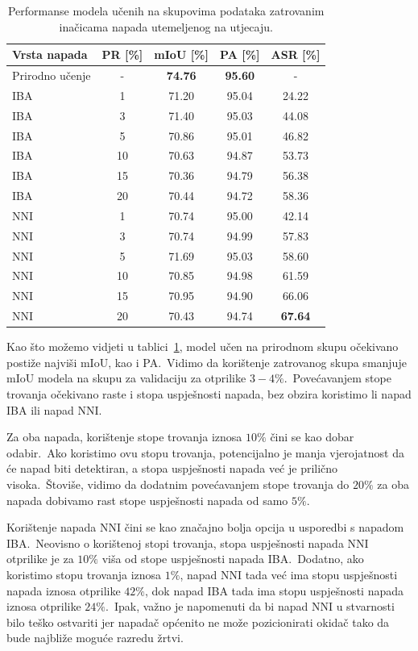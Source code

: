 \documentclass[times, utf8, seminar, numeric]{fer}
\begin{document}
\begin{table}[htb]
    \caption{Performanse modela učenih na skupovima podataka zatrovanim inačicama napada utemeljenog na utjecaju.}
    \label{tbl:performanse_iba}
    \centering
    \begin{tabular}{lcccc} \hline
    Vrsta napada & PR [\%] & mIoU [\%] & PA [\%] & ASR [\%] \\ \hline
    Prirodno učenje & - & \textbf{74.76} & \textbf{95.60} & - \\ \hline
    IBA & 1 & 71.20 & 95.04 & 24.22 \\
    IBA & 3 & 71.40 & 95.03 & 44.08 \\
    IBA & 5 & 70.86 & 95.01 & 46.82 \\
    IBA & 10 & 70.63 & 94.87 & 53.73 \\
    IBA & 15 & 70.36 & 94.79 & 56.38 \\
    IBA & 20 & 70.44 & 94.72 & 58.36 \\ \hline
    NNI & 1 & 70.74 & 95.00 & 42.14 \\
    NNI & 3 & 70.74 & 94.99 & 57.83 \\ 
    NNI & 5 & 71.69 & 95.03 & 58.60 \\ 
    NNI & 10 & 70.85 & 94.98 & 61.59 \\
    NNI & 15 & 70.95 & 94.90 & 66.06 \\
    NNI & 20 & 70.43 & 94.74 & \textbf{67.64} \\ \hline
    \end{tabular}
\end{table}

Kao što možemo vidjeti u tablici~\ref{tbl:performanse_iba}, model učen na prirodnom skupu očekivano postiže najviši mIoU, kao i PA.\ 
Vidimo da korištenje zatrovanog skupa smanjuje mIoU modela na skupu za validaciju za otprilike $3-4\%$.\
Povećavanjem stope trovanja očekivano raste i stopa uspješnosti napada, bez obzira koristimo li napad IBA ili napad NNI.\ 

Za oba napada, korištenje stope trovanja iznosa $10\%$ čini se kao dobar odabir.\ 
Ako koristimo ovu stopu trovanja, potencijalno je manja vjerojatnost da će napad biti detektiran, a stopa uspješnosti napada već je prilično visoka.\ 
Štoviše, vidimo da dodatnim povećavanjem stope trovanja do $20\%$ za oba napada dobivamo rast stope uspješnosti napada od samo $5\%$.\ 
  
Korištenje napada NNI čini se kao značajno bolja opcija u usporedbi s napadom IBA.\ 
Neovisno o korištenoj stopi trovanja, stopa uspješnosti napada NNI otprilike je za $10\%$ viša od stope uspješnosti napada IBA.\
Dodatno, ako koristimo stopu trovanja iznosa $1\%$, napad NNI tada već ima stopu uspješnosti napada iznosa otprilike $42\%$, dok napad IBA tada ima stopu uspješnosti napada iznosa otprilike $24\%$.\ 
Ipak, važno je napomenuti da bi napad NNI u stvarnosti bilo teško ostvariti jer napadač općenito ne može pozicionirati okidač tako da bude najbliže moguće razredu žrtvi.\
\end{document}
